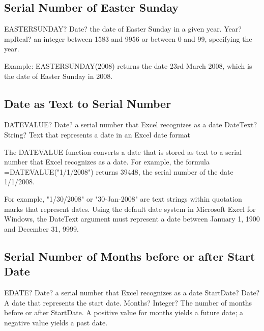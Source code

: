 \subsection{Serial Number of Easter Sunday}

\begin{mpFunctionsExtract}
	\mpWorksheetFunctionOneNotImplemented
	{EASTERSUNDAY? Date? the date of Easter Sunday in a given year.}
	{Year? mpReal? an integer between 1583 and 9956 or between 0 and 99, specifying the year. }
\end{mpFunctionsExtract}

\vspace{0.3cm}
Example: EASTERSUNDAY(2008) returns the date 23rd March 2008, which is the date of Easter Sunday in 2008. 






\subsection{Date as Text to Serial Number}

\begin{mpFunctionsExtract}
	\mpWorksheetFunctionOneNotImplemented
	{DATEVALUE? Date? a serial number that Excel recognizes as a date}
	{DateText? String? Text that represents a date in an Excel date format}
\end{mpFunctionsExtract}

\vspace{0.3cm}
The DATEVALUE function converts a date that is stored as text to a serial number that Excel recognizes as a date. For example, the formula =DATEVALUE("1/1/2008") returns 39448, the serial number of the date 1/1/2008.

For example, "1/30/2008" or "30-Jan-2008" are text strings within quotation marks that represent dates. 
Using the default date system in Microsoft Excel for Windows, the DateText argument must represent a date between January 1, 1900 and December 31, 9999.





\subsection{Serial Number of Months before or after Start Date}

\begin{mpFunctionsExtract}
	\mpWorksheetFunctionTwoNotImplemented
	{EDATE? Date? a serial number that Excel recognizes as a date}
	{StartDate? Date? A date that represents the start date.}
	{Months? Integer? The number of months before or after StartDate. A positive value for months yields a future date; a negative value yields a past date.}
\end{mpFunctionsExtract}

